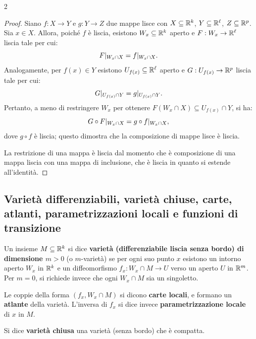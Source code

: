 \begin{multicols*}{2}
    \begin{proof}
        Siano $f : X \to Y$ e $g : Y \to Z$ due mappe lisce con $X \subseteq \mathbb{R}^k$,
        $Y \subseteq \mathbb{R}^\ell$, $Z \subseteq \mathbb{R}^p$. Sia $x \in X$. Allora,
        poiché $f$ è liscia, esistono $W_x \subseteq \mathbb{R}^k$ aperto e $F : W_x \to \mathbb{R}^\ell$ liscia tale per cui:
        \[
            F\arrowvert_{W_x \cap X} = f\arrowvert_{W_x \cap X}.
        \]
        Analogamente, per $f(x) \in Y$ esistono $U_{f(x)} \subseteq \mathbb{R}^\ell$ aperto e
        $G : U_{f(x)} \to \mathbb{R}^p$ liscia tale per cui:
        \[
            G\arrowvert_{U_{f(x)} \cap Y} = g\arrowvert_{U_{f(x)} \cap Y}.
        \]
        Pertanto, a meno di restringere $W_x$ per ottenere $F(W_x \cap X) \subseteq U_{f(x)} \cap Y$,
        si ha:
        \[
            G \circ F\arrowvert_{W_x \cap X} = g \circ f\arrowvert_{W_x \cap X},
        \]
        dove $g \circ f$ è liscia; questo dimostra che la composizione di mappe
        lisce è liscia. \smallskip

        La restrizione di una mappa è liscia dal momento che è composizione
        di una mappa liscia con una mappa di inclusione, che è liscia in quanto
        si estende all'identità.
    \end{proof}

    \subsection{Varietà differenziabili, varietà chiuse, carte, atlanti, parametrizzazioni locali e funzioni di transizione}

    \begin{definition}
        Un insieme $M \subseteq \mathbb{R}^k$ si dice \textbf{varietà (differenziabile liscia senza bordo) di dimensione $m>0$} (o $m$-varietà) se per ogni
        suo punto $x$ esistono un intorno aperto $W_x$ in $\mathbb{R}^k$ e un diffeomorfismo
        $f_x : W_x \cap M \to U$ verso un aperto $U$ in $\mathbb{R}^m$. Per $m = 0$, si richiede invece
        che ogni $W_x \cap M$ sia un singoletto. \smallskip

        Le coppie della forma $(f_x, W_x \cap M)$ si dicono \textbf{carte locali}, e formano un \textbf{atlante} della varietà. L'inversa di
        $f_x$ si dice invece \textbf{parametrizzazione locale} di $x$ in $M$.
    \end{definition}

    \begin{definition}
        Si dice \textbf{varietà chiusa} una varietà (senza bordo) che è compatta.
    \end{definition}


\end{multicols*}
